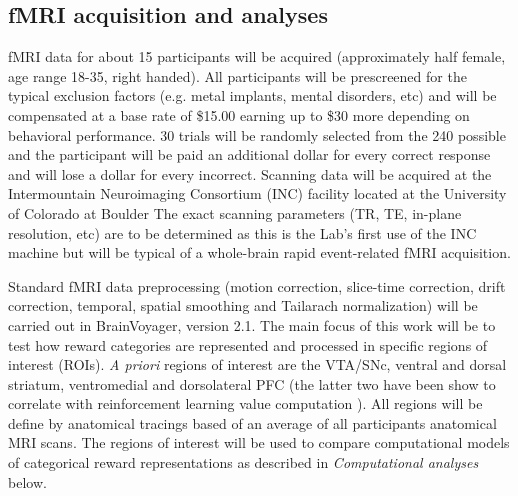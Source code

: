 \documentclass[doc,12pt]{apa}        %
\begin{document}
\subsection{fMRI acquisition and analyses} %
\label{sub:fmri}

fMRI data for about 15 participants will be acquired  (approximately half female, age range 18-35, right handed).   All participants will be prescreened for the typical exclusion factors (e.g. metal implants, mental disorders, etc) and will be compensated at a base rate of \$15.00 earning up to \$30 more depending on behavioral performance. 30 trials will be randomly selected from the 240 possible and the participant will be paid an additional dollar for every correct response and will lose a dollar for every incorrect. Scanning data will be acquired at the Intermountain Neuroimaging Consortium (INC) facility located at the University of Colorado at Boulder The exact scanning parameters (TR, TE, in-plane resolution, etc) are to be determined as this is the Lab's first use of the INC machine but will be typical of a whole-brain rapid event-related fMRI acquisition.

Standard fMRI data preprocessing (motion correction, slice-time correction, drift correction, temporal, spatial smoothing and Tailarach normalization) will be carried out in BrainVoyager, version 2.1.  The main focus of this work will be to test how reward categories are represented and processed in specific regions of interest (ROIs).  \emph{A priori} regions of interest are the VTA/SNc, ventral and dorsal striatum, ventromedial and dorsolateral PFC (the latter two have been show to correlate with reinforcement learning value computation ).  All regions will be define by anatomical tracings based of an average of all participants anatomical MRI scans.  The regions of interest will be used to compare computational models of categorical reward representations as described in \emph{Computational analyses} below.
\end{document}
